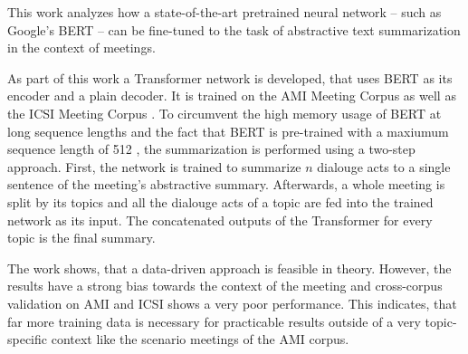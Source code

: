 This work analyzes how a state-of-the-art pretrained neural network -- such as Google's BERT \cite{devlin2018bert} -- can be fine-tuned to the task of abstractive text summarization in the context of meetings.

As part of this work a Transformer network \cite{1706.03762} is developed, that uses BERT as its encoder and a plain decoder.
It is trained on the AMI Meeting Corpus \cite{Mccowan05theami} as well as the ICSI Meeting Corpus \cite{Janin}.
To circumvent the high memory usage of BERT at long sequence lengths and the fact that BERT is pre-trained with a maxiumum sequence length of 512 \cite[p.~13]{devlin2018bert}, the summarization is performed using a two-step approach.
First, the network is trained to summarize \(n\) dialouge acts to a single sentence of the meeting's abstractive summary.
Afterwards, a whole meeting is split by its topics and all the dialouge acts of a topic are fed into the trained network as its input.
The concatenated outputs of the Transformer for every topic is the final summary.

The work shows, that a data-driven approach is feasible in theory.
However, the results have a strong bias towards the context of the meeting and cross-corpus validation on AMI and ICSI shows a very poor performance.
This indicates, that far more training data is necessary for practicable results outside of a very topic-specific context like the scenario meetings of the AMI corpus. 